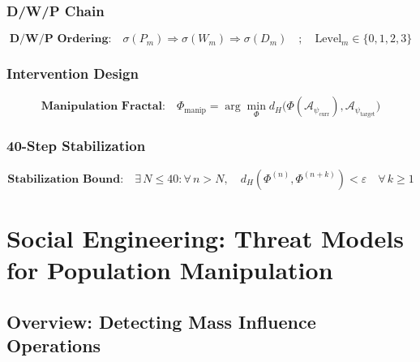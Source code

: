 \documentclass[11pt,twoside]{book}
\theoremstyle{definition}
\theoremstyle{plain}
\theoremstyle{remark}
\newcommand{\Frac}{\Phi}
\newcommand{\PsychAttractor}{\mathcal{A}_\psi}
\newcommand{\ManipFrac}{\Phi_{\mathrm{manip}}}
\begin{document}
\section{D/W/P Chain}

\begin{equation}
\boxed{
    \textbf{D/W/P Ordering:} \quad
    \sigma(P_m) \Rightarrow \sigma(W_m) \Rightarrow \sigma(D_m)
    \quad ; \quad \mathrm{Level}_m \in \{0, 1, 2, 3\}
}
\label{eq:psych-dwp}
\end{equation}

\section{Intervention Design}

\begin{equation}
\boxed{
    \textbf{Manipulation Fractal:} \quad
    \ManipFrac = \arg\min_{\Frac} d_H\bigl(\Frac(\PsychAttractor_{\mathrm{curr}}), \PsychAttractor_{\mathrm{target}}\bigr)
}
\label{eq:psych-manip}
\end{equation}

\section{40-Step Stabilization}

\begin{equation}
\boxed{
    \textbf{Stabilization Bound:} \quad
    \exists\, N \leq 40 : \forall\, n > N, \quad
    d_H(\Frac^{(n)}, \Frac^{(n+k)}) < \varepsilon \quad \forall\, k \geq 1
}
\label{eq:psych-40step}
\end{equation}

\part{Social Engineering: Threat Models for Population Manipulation}
\label{part:social-engineering}

\chapter{Overview: Detecting Mass Influence Operations}
\label{ch:se-overview}
\end{document}

